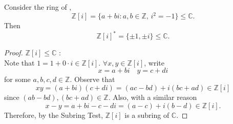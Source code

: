 \begin{eg}
  Consider the ring of ,
  \begin{equation*}
    \mathbb{Z}[i] = \{a + bi : a, b \in \mathbb{Z}, \, i^2 = -1 \} \leq \mathbb{C}.
  \end{equation*}
  Then
  \begin{equation*}
    \mathbb{Z}[i]^* = \{ \pm 1, \pm i \} \leq \mathbb{C}.
  \end{equation*}

  \begin{proof}
    \textbf{$\mathbb{Z}[i] \leq \mathbb{C}$} : \\
    Note that $1 = 1 + 0 \cdot i \in \mathbb{Z}[i]$. $\forall x, y \in \mathbb{Z}[i]$, write
    \begin{equation*}
      x = a + bi \quad y = c + di
    \end{equation*}
    for some $a, b, c, d \in \mathbb{Z}$. Observe that
    \begin{equation}\label{eq:q5_a_1}
      xy = (a + bi)(c + di) = (ac - bd) + i (bc + ad) \in \mathbb{Z}[i]
    \end{equation}
    since $(ab - bd), (bc + ad) \in \mathbb{Z}$. Also, with a similar reason
    \begin{equation*}
      x - y = a + bi - c - di = (a - c) + i (b - d) \in \mathbb{Z}[i].
    \end{equation*}
    Therefore, by the Subring Test, $\mathbb{Z}[i]$ is a subring of $\mathbb{C}$.


\end{proof}
\end{eg}
